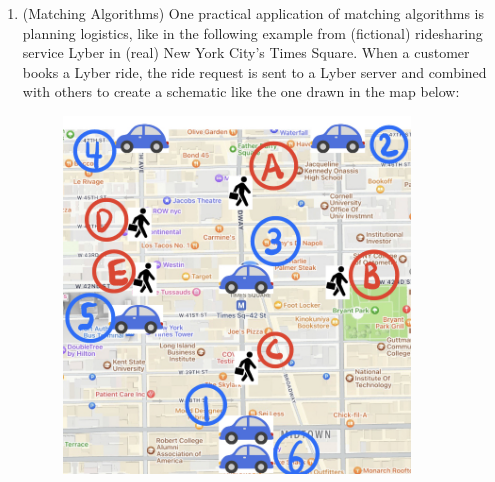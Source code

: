 \documentclass[11pt]{article}
\begin{document}
\begin{enumerate}
\begin{enumerate}
Postprocessing takes $n \cdot O(1+1+1+1) + O(1) = n\cdot O(4) + O(1) = O(n)$ time. \\

Aggregating, I get that my algorithm takes $O(n \log n) + O(n \log{k}) + O(n) = O(n(\log n + \log{k}) + n) = O(n(\log n + \log n) + n) = O(2n \log n + n) = O(2n \log n) = O(n \log n)$ time, using the fact $k = O(n)$ since we can't have more colors assigned than the number of intervals we can assign them to. From this analysis and that above, I've proven that my correct Greedy Coloring algorithm in order of increasing start time can be implemented in time $O(n \log n)$.  \\

\end{enumerate}


    \item (Matching Algorithms) 
    One practical application of matching algorithms is planning logistics, like in the following example from (fictional) ridesharing service Lyber in (real) New York City's Times Square.  When a customer books a Lyber ride, the ride request is sent to a Lyber server and combined with others to create a schematic like the one drawn in the map below:

    \begin{figure}[H]
        \centering
        \includegraphics[width=0.87\textwidth]{fall2024/psets/ps6/NYC-map-zoomed-light.jpeg}
        \label{fig:travel_time_graph}
    \end{figure}


\end{enumerate}
\end{document}
